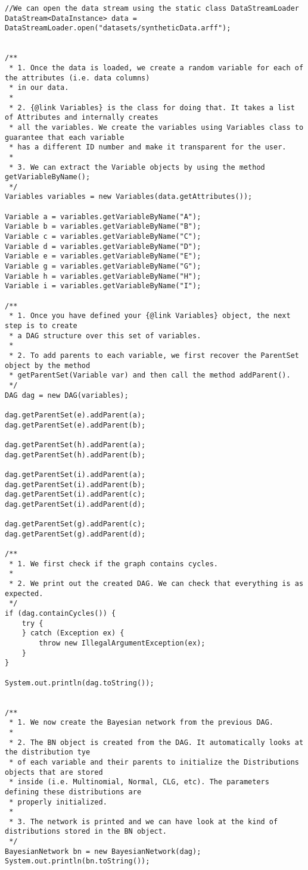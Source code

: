 \begin{lstlisting}
//We can open the data stream using the static class DataStreamLoader
DataStream<DataInstance> data = DataStreamLoader.open("datasets/syntheticData.arff");


/**
 * 1. Once the data is loaded, we create a random variable for each of the attributes (i.e. data columns)
 * in our data.
 *
 * 2. {@link Variables} is the class for doing that. It takes a list of Attributes and internally creates
 * all the variables. We create the variables using Variables class to guarantee that each variable
 * has a different ID number and make it transparent for the user.
 *
 * 3. We can extract the Variable objects by using the method getVariableByName();
 */
Variables variables = new Variables(data.getAttributes());

Variable a = variables.getVariableByName("A");
Variable b = variables.getVariableByName("B");
Variable c = variables.getVariableByName("C");
Variable d = variables.getVariableByName("D");
Variable e = variables.getVariableByName("E");
Variable g = variables.getVariableByName("G");
Variable h = variables.getVariableByName("H");
Variable i = variables.getVariableByName("I");

/**
 * 1. Once you have defined your {@link Variables} object, the next step is to create
 * a DAG structure over this set of variables.
 *
 * 2. To add parents to each variable, we first recover the ParentSet object by the method
 * getParentSet(Variable var) and then call the method addParent().
 */
DAG dag = new DAG(variables);

dag.getParentSet(e).addParent(a);
dag.getParentSet(e).addParent(b);

dag.getParentSet(h).addParent(a);
dag.getParentSet(h).addParent(b);

dag.getParentSet(i).addParent(a);
dag.getParentSet(i).addParent(b);
dag.getParentSet(i).addParent(c);
dag.getParentSet(i).addParent(d);

dag.getParentSet(g).addParent(c);
dag.getParentSet(g).addParent(d);

/**
 * 1. We first check if the graph contains cycles.
 *
 * 2. We print out the created DAG. We can check that everything is as expected.
 */
if (dag.containCycles()) {
    try {
    } catch (Exception ex) {
        throw new IllegalArgumentException(ex);
    }
}

System.out.println(dag.toString());


/**
 * 1. We now create the Bayesian network from the previous DAG.
 *
 * 2. The BN object is created from the DAG. It automatically looks at the distribution tye
 * of each variable and their parents to initialize the Distributions objects that are stored
 * inside (i.e. Multinomial, Normal, CLG, etc). The parameters defining these distributions are
 * properly initialized.
 *
 * 3. The network is printed and we can have look at the kind of distributions stored in the BN object.
 */
BayesianNetwork bn = new BayesianNetwork(dag);
System.out.println(bn.toString());



\end{lstlisting}

